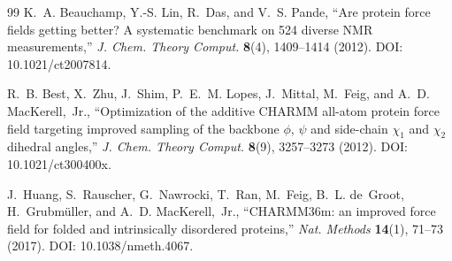 \begin{thebibliography}{99}
K.~A. Beauchamp, Y.-S. Lin, R.~Das, and V.~S. Pande,
``Are protein force fields getting better? A systematic benchmark on 524
diverse NMR measurements,''
\emph{J. Chem. Theory Comput.} \textbf{8}(4), 1409--1414 (2012).
DOI: 10.1021/ct2007814.

R.~B. Best, X.~Zhu, J.~Shim, P.~E.~M. Lopes, J.~Mittal, M.~Feig, and
A.~D. MacKerell,~Jr.,
``Optimization of the additive CHARMM all-atom protein force field targeting
improved sampling of the backbone $\phi$, $\psi$ and side-chain $\chi_1$ and
$\chi_2$ dihedral angles,''
\emph{J. Chem. Theory Comput.} \textbf{8}(9), 3257--3273 (2012).
DOI: 10.1021/ct300400x.

J.~Huang, S.~Rauscher, G.~Nawrocki, T.~Ran, M.~Feig, B.~L. de~Groot,
H.~Grubm\"uller, and A.~D. MacKerell,~Jr.,
``CHARMM36m: an improved force field for folded and intrinsically disordered
proteins,''
\emph{Nat. Methods} \textbf{14}(1), 71--73 (2017).
DOI: 10.1038/nmeth.4067.

\end{thebibliography}
